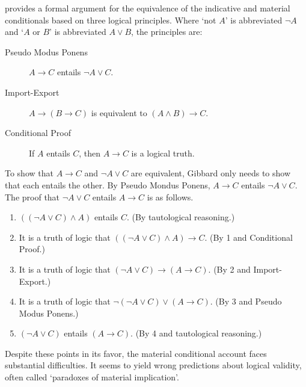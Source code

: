 \citet{Gibbard1981-GIBTRT} provides a formal argument for the equivalence of the indicative and material conditionals based on three logical principles.  Where `not $A$' is abbreviated $\neg A$ and `$A$ or $B$' is abbreviated $A \vee B$, the principles are:
\begin{description}
\item[Pseudo Modus Ponens] $A \rightarrow C$ entails $\neg A \vee C$.
\item[Import-Export] $A \rightarrow (B \rightarrow C)$ is equivalent to $(A \wedge B) \rightarrow C$.
\item[Conditional Proof] If $A$ entails $C$, then $A \rightarrow C$ is a logical truth.
\end{description}
To show that $A \rightarrow C$ and $\neg A \vee C$ are equivalent, Gibbard only needs to show that each entails the other.  By Pseudo Mondus Ponens, $A \rightarrow C$ entails $\neg A \vee C$.  The proof that $\neg A  \vee C$ entails $A \rightarrow C$ is as follows.
\begin{enumerate}
\item $((\neg A \vee C) \wedge A)$ entails $C$. (By tautological reasoning.)
\item It is a truth of logic that $((\neg A \vee C) \wedge A) \rightarrow C$. (By 1 and Conditional Proof.)
\item It is a truth of logic that $(\neg A \vee C) \rightarrow (A \rightarrow C)$. (By 2 and Import-Export.)
\item It is a truth of logic that $\neg (\neg A \vee C) \vee (A \rightarrow C)$. (By 3 and Pseudo Modus Ponens.)
\item $(\neg A \vee C)$ entails $(A \rightarrow C)$. (By 4 and tautological reasoning.)
\end{enumerate}

Despite these points in its favor, the material conditional account faces substantial difficulties.  It seems to yield wrong predictions about logical validity, often called `paradoxes of material implication'.

